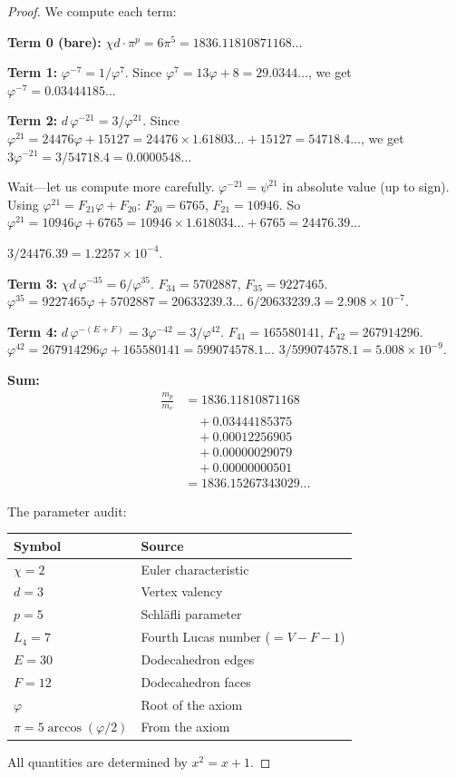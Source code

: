 \documentclass[11pt,a4paper]{article}
\theoremstyle{plain}
\theoremstyle{definition}
\newcommand{\vp}{\varphi}
\begin{document}
\begin{proof}
We compute each term:

\medskip\noindent\textbf{Term 0 (bare):}
$\chi d \cdot \pi^p = 6\pi^5 = 1836.11810871168\ldots$

\medskip\noindent\textbf{Term 1:}
$\vp^{-7} = 1/\vp^7$.  Since $\vp^7 = 13\vp + 8 = 29.0344\ldots$,
we get $\vp^{-7} = 0.03444185\ldots$

\medskip\noindent\textbf{Term 2:}
$d\,\vp^{-21} = 3/\vp^{21}$.  Since $\vp^{21} = 24476\vp + 15127
= 24476 \times 1.61803\ldots + 15127 = 54718.4\ldots$,
we get $3\vp^{-21} = 3/54718.4 = 0.0000548\ldots$

Wait---let us compute more carefully.  $\vp^{-21} = \psi^{21}$ in absolute
value (up to sign).  Using $\vp^{21} = F_{21}\vp + F_{20}$:
$F_{20} = 6765$, $F_{21} = 10946$.  So $\vp^{21} = 10946\vp + 6765
= 10946 \times 1.618034\ldots + 6765 = 24476.39\ldots$

$3/24476.39 = 1.2257 \times 10^{-4}$.

\medskip\noindent\textbf{Term 3:}
$\chi d\,\vp^{-35} = 6/\vp^{35}$.
$F_{34} = 5702887$, $F_{35} = 9227465$.
$\vp^{35} = 9227465\vp + 5702887 = 20633239.3\ldots$
$6/20633239.3 = 2.908 \times 10^{-7}$.

\medskip\noindent\textbf{Term 4:}
$d\,\vp^{-(E+F)} = 3\vp^{-42} = 3/\vp^{42}$.
$F_{41} = 165580141$, $F_{42} = 267914296$.
$\vp^{42} = 267914296\vp + 165580141 = 599074578.1\ldots$
$3/599074578.1 = 5.008 \times 10^{-9}$.

\medskip\noindent\textbf{Sum:}
\begin{align*}
  \frac{m_p}{m_e}
  &= 1836.11810871168 \\
  &\quad + 0.03444185375 \\
  &\quad + 0.00012256905 \\
  &\quad + 0.00000029079 \\
  &\quad + 0.00000000501 \\
  &= 1836.15267343029\ldots
\end{align*}

The parameter audit:
\begin{center}
\begin{tabular}{@{}ll@{}}
\toprule
Symbol & Source \\
\midrule
$\chi = 2$ & Euler characteristic \\
$d = 3$ & Vertex valency \\
$p = 5$ & Schl\"afli parameter \\
$L_4 = 7$ & Fourth Lucas number ($= V - F - 1$) \\
$E = 30$ & Dodecahedron edges \\
$F = 12$ & Dodecahedron faces \\
$\vp$ & Root of the axiom \\
$\pi = 5\arccos(\vp/2)$ & From the axiom \\
\bottomrule
\end{tabular}
\end{center}
All quantities are determined by $x^2 = x + 1$.
\end{proof}
\end{document}
